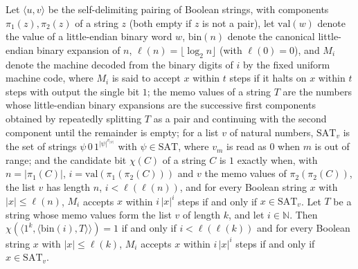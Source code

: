 \begin{theorem}
\label{Complexity.ladner_candidate_selectCtx}
\leanok
{}
Let $\langle u,v\rangle$ be the self-delimiting pairing of Boolean strings, with components $\pi_1(z),\pi_2(z)$ of a string $z$ (both empty if $z$ is not a pair), let $\mathrm{val}(w)$ denote the value of a little-endian binary word $w$, $\mathrm{bin}(n)$ denote the canonical little-endian binary expansion of $n$, $\ell(n)=\lfloor\log_2 n\rfloor$ (with $\ell(0)=0$), and $M_i$ denote the machine decoded from the binary digits of $i$ by the fixed uniform machine code, where $M_i$ is said to accept $x$ within $t$ steps if it halts on $x$ within $t$ steps with output the single bit $1$; the memo values of a string $T$ are the numbers whose little-endian binary expansions are the successive first components obtained by repeatedly splitting $T$ as a pair and continuing with the second component until the remainder is empty; for a list $v$ of natural numbers, $\mathrm{SAT}_v$ is the set of strings $\psi\,0\,1^{|\psi|^{v_{|\psi|}}}$ with $\psi\in\mathrm{SAT}$, where $v_m$ is read as $0$ when $m$ is out of range; and the candidate bit $\chi(C)$ of a string $C$ is $1$ exactly when, with $n=|\pi_1(C)|$, $i=\mathrm{val}(\pi_1(\pi_2(C)))$ and $v$ the memo values of $\pi_2(\pi_2(C))$, the list $v$ has length $n$, $i<\ell(\ell(n))$, and for every Boolean string $x$ with $|x|\le\ell(n)$, $M_i$ accepts $x$ within $i\,|x|^i$ steps if and only if $x\in\mathrm{SAT}_v$. Let $T$ be a string whose
memo values form the list $v$ of length $k$, and let $i\in\mathbb N$. Then
$\chi(\langle 1^{k},\langle\mathrm{bin}(i),T\rangle\rangle)=1$ if and only if $i<\ell(\ell(k))$ and
for every Boolean string $x$ with $|x|\le\ell(k)$, $M_i$ accepts $x$ within $i\,|x|^i$ steps if
and only if $x\in\mathrm{SAT}_v$.
\end{theorem}

